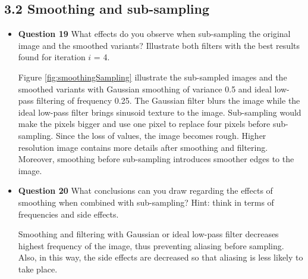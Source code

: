 \documentclass[11pt,a4paper]{article}
\begin{document}
\subsection*{3.2 Smoothing and sub-sampling}
\begin{itemize}
	\item \textbf{Question 19} What effects do you observe when sub-sampling the original image and the smoothed variants? Illustrate both filters with the best results found for iteration $i$ = 4.
	\par Figure \ref{fig:smoothingSampling} illustrate the sub-sampled images and the smoothed variants with Gaussian smoothing of variance 0.5 and ideal low-pass filtering of frequency 0.25. The Gaussian filter blurs the image while the ideal low-pass filter brings sinusoid texture to the image. Sub-sampling would make the pixels bigger and use one pixel to replace four pixels before sub-sampling. Since the loss of values, the image becomes rough. Higher resolution image contains more details after smoothing and filtering. Moreover, smoothing before sub-sampling introduces smoother edges to the image.
	
	\item \textbf{Question 20} What conclusions can you draw regarding the effects of smoothing when combined with sub-sampling? Hint: think in terms of frequencies and side effects.
	\par Smoothing and filtering with Gaussian or ideal low-pass filter decreases highest frequency of the image, thus preventing aliasing before sampling. Also, in this way, the side effects are decreased so that aliasing is less likely to take place.
	

\end{itemize}
\end{document}
